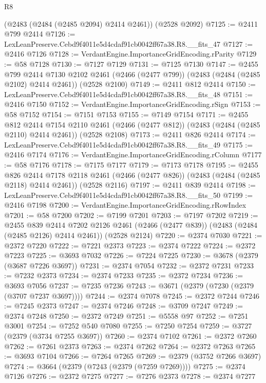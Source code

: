 \begin{lexlean}{R8}
\begin{coremodule}
    (@2483 (@2484 (@2485 @2094) @2414 @2461))
    (@2528 @2092)
@7125 := @2411 @799 @2414
@7126 := LexLeanPreserve.Cebd9f4011e5d4cdaf91cb0042ff67a38.R8.__fits_47
@7127 := @2416 @7126
@7128 := VerdantEngine.ImportanceGridEncoding.rParity
@7129 := @58 @7128
@7130 := @7127 @7129
@7131 := @7125 @7130
@7147 := @2455
    @799
    @2414
    @7130
    @2102
    @2461
    (@2466 (@2477 @799))
    (@2483 (@2484 (@2485 @2102) @2414 @2461))
    (@2528 @2100)
@7149 := @2411 @812 @2414
@7150 := LexLeanPreserve.Cebd9f4011e5d4cdaf91cb0042ff67a38.R8.__fits_48
@7151 := @2416 @7150
@7152 := VerdantEngine.ImportanceGridEncoding.rSign
@7153 := @58 @7152
@7154 := @7151 @7153
@7155 := @7149 @7154
@7171 := @2455
    @812
    @2414
    @7154
    @2110
    @2461
    (@2466 (@2477 @812))
    (@2483 (@2484 (@2485 @2110) @2414 @2461))
    (@2528 @2108)
@7173 := @2411 @826 @2414
@7174 := LexLeanPreserve.Cebd9f4011e5d4cdaf91cb0042ff67a38.R8.__fits_49
@7175 := @2416 @7174
@7176 := VerdantEngine.ImportanceGridEncoding.rColumn
@7177 := @58 @7176
@7178 := @7175 @7177
@7179 := @7173 @7178
@7195 := @2455
    @826
    @2414
    @7178
    @2118
    @2461
    (@2466 (@2477 @826))
    (@2483 (@2484 (@2485 @2118) @2414 @2461))
    (@2528 @2116)
@7197 := @2411 @839 @2414
@7198 := LexLeanPreserve.Cebd9f4011e5d4cdaf91cb0042ff67a38.R8.__fits_50
@7199 := @2416 @7198
@7200 := VerdantEngine.ImportanceGridEncoding.rRowIndex
@7201 := @58 @7200
@7202 := @7199 @7201
@7203 := @7197 @7202
@7219 := @2455
    @839
    @2414
    @7202
    @2126
    @2461
    (@2466 (@2477 @839))
    (@2483 (@2484 (@2485 @2126) @2414 @2461))
    (@2528 @2124)
@7220 := @2374 @7030
@7221 := @2372 @7220
@7222 := @7221 @2373
@7223 := @2374 @7222
@7224 := @2372 @7223
@7225 := @3693 @7032
@7226 := @7224 @7225
@7230 := @3678 (@2379 (@3687 @7226 @3697))
@7231 := @2374 @7054
@7232 := @2372 @7231
@7233 := @7232 @2373
@7234 := @2374 @7233
@7235 := @2372 @7234
@7236 := @3693 @7056
@7237 := @7235 @7236
@7243 := @3671 (@2379 (@7230 (@2379 (@3707 @7237 @3697))))
@7244 := @2374 @7078
@7245 := @2372 @7244
@7246 := @7245 @2373
@7247 := @2374 @7246
@7248 := @3709 @7247
@7249 := @2374 @7248
@7250 := @2372 @7249
@7251 := @5558 @97
@7252 := @7251 @3001
@7254 := @7252 @540 @7080
@7255 := @7250 @7254
@7259 := @3727 (@2379 (@3734 @7255 @3697))
@7260 := @2374 @7102
@7261 := @2372 @7260
@7262 := @7261 @2373
@7263 := @2374 @7262
@7264 := @2372 @7263
@7265 := @3693 @7104
@7266 := @7264 @7265
@7269 := @2379 (@3752 @7266 @3697)
@7274 := @3664 (@2379 (@7243 (@2379 (@7259 @7269))))
@7275 := @2374 @7126
@7276 := @2372 @7275
@7277 := @7276 @2373
@7278 := @2374 @7277

\end{coremodule}
\end{lexlean}
